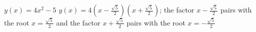 {$y(x)=4x^2-5$}
{$y(x) = 4(x-\frac{\sqrt{5}}{2})(x+\frac{\sqrt{5}}{2})$; the factor $x-\frac{\sqrt{5}}{2}$ pairs with the root $x=\frac{\sqrt{5}}{2}$ and the factor $x+\frac{\sqrt{5}}{2}$ pairs with the root $x=-\frac{\sqrt{5}}{2}$}
